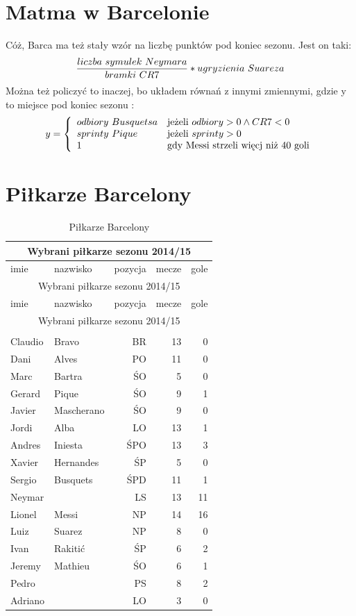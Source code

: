 \documentclass[11pt, a4paper]{article}
\begin{document}
\section{Matma w Barcelonie}
\label{sec:Matma}
Cóż, Barca ma też stały wzór na liczbę punktów pod koniec sezonu. Jest on taki:
$$\frac{liczba~symulek~Neymara\index{Neymar}}{bramki~CR7} * {ugryzienia~Suareza\index{Suarez}}$$
Można też policzyć to inaczej, bo układem równań z innymi zmiennymi, gdzie y to miejsce pod koniec sezonu :
\begin{equation}
	y = \left\{	
	\begin{array}{ll}
	odbiory~Busquetsa\index{Busquets} & \textrm{jeżeli $odbiory > 0 \land CR7 <0$} \\
	sprinty~Pique\index{Pique} & \textrm{jeżeli $sprinty > 0 $} \\
	1 & \textrm{gdy Messi\index{Messi} strzeli więcj niż 40 goli}
		
	\end{array} \right.
	\label{eq:nr1}
\end{equation}
\section{Piłkarze Barcelony}
\label{sec:Pilkarze}
\begin{longtable}{|l|l|r|r|r|}
\caption{Piłkarze Barcelony}\\\hline
\multicolumn{5}{|c|}{Wybrani piłkarze sezonu 2014/15}\\\hline
imie & nazwisko & pozycja & mecze & gole \\ \hline
\endfirsthead
\hline
\multicolumn{5}{|c|}{Wybrani piłkarze sezonu 2014/15}\\
imie & nazwisko & pozycja & mecze & gole \\ \hline
\endhead
\hline \multicolumn{5}{|c|}{Wybrani piłkarze sezonu 2014/15}\\ \hline
\endfoot
\hline \multicolumn{5}{|c|}{Wybrani piłkarze sezonu 2014/15}\\
\hline
\endlastfoot
Claudio & Bravo\index{Bravo} & BR & 13 & 0 \\
Dani  & Alves \index{Dani Alves} & PO & 11 & 0 \\
Marc & Bartra \index{Bartra} & ŚO & 5 & 0 \\
Gerard & Pique \index{Pique} & ŚO & 9 & 1 \\
Javier  & Mascherano & ŚO & 9 & 0 \\
Jordi & Alba & LO & 13 & 1 \\
Andres & Iniesta & ŚPO & 13 & 3 \\
Xavier  & Hernandes & ŚP & 5 & 0 \\
Sergio & Busquets & ŚPD & 11 & 1 \\
Neymar & & LS & 13 & 11 \\
Lionel  & Messi & NP & 14 & 16 \\
Luiz & Suarez & NP & 8 & 0 \\
Ivan & Rakitić & ŚP & 6 & 2 \\
Jeremy & Mathieu & ŚO & 6 & 1 \\
Pedro &  & PS & 8 & 2 \\
Adriano &  & LO & 3 & 0 \\
\end{longtable}
\end{document}

